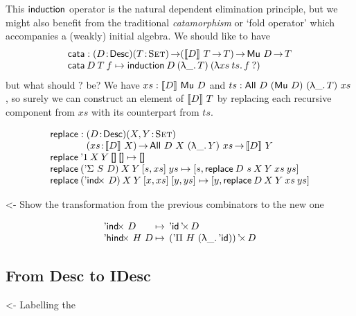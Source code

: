 \documentclass[preprint, authoryear, onecolumn]{sigplanconf}
\newenvironment{structure}{\footnotesize\verbatim}{\endverbatim}
\begin{document}
This \(\F{induction}\) operator is the natural dependent elimination
principle, but we might also benefit from the traditional \emph{catamorphism}
or `fold operator' which accompanies a (weakly) initial algebra. We should
like to have
\[\stk{
\F{cata} : \PITEL{D}{\Desc}
           \PI{T}{\Set}
           (\descop{D}{T}\To T) \To 
           \Mu{D} \To T \\
\F{cata}\: D\: T\: f \mapsto
  \F{induction}\: D\: (\LAM{\_}T)\: (\LAM{xs\:ts} f\: ?)
}\]
but what should \(?\) be? We have \(xs:\descop{D}{\Mu{D}}\)
and \(ts:\All{D}{(\Mu{D})}{(\LAM{\_}T)}{xs}\), so surely we can construct
an element of \(\descop{D}{T}\) by replacing each recursive component from
\(xs\) with its counterpart from \(ts\).

\[\stk{
\F{replace} : \stk{\PITEL{D}{\Desc}
                   \PITEL{X,Y}{\Set}\\
                   \PI{xs}{\descop{D}{X}} 
                   \All{D}{X}{(\LAM{\_}Y)}{xs} \To
                   \descop{D}{Y}} \\
\F{replace}\: \DUnit\:          X\: Y\: \Void\:          \Void          \mapsto \Void \\
\F{replace}\: (\DSigma{S}{D})\: X\: Y\: \pair{s}{xs}{}\: ys             \mapsto
    \pair{s}{\F{replace}\: {D~s}\: X\: Y\: xs\: ys}{}         \\
\F{replace}\: (\DIndx{D})\:     X\: Y\: \pair{x}{xs}{}\: \pair{y}{ys}{} \mapsto
    \pair{y}{\F{replace}\: D\: X\: Y\: xs\: ys}{}
}\]


\begin{structure}
<- Show the transformation from the previous combinators to the new one
\end{structure}

\[\begin{array}{l@{\:\mapsto\:\:}l}
\DIndx{D}         & \DProd{\DId}{D}                      \\
\DHindx{H}{D}     & \DProd{(\DPi{H}{(\LAM{\_} \DId)})}{D}
\end{array}
\]


\subsection{From Desc to IDesc}

\begin{structure}
<- Labelling the \DId
\end{structure}

\end{document}

